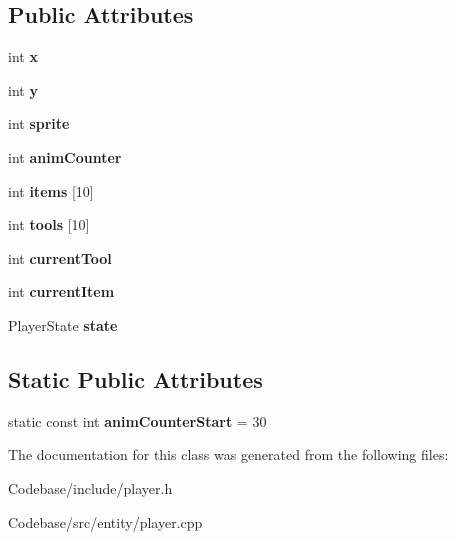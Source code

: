 \subsection*{Public Attributes}
\begin{DoxyCompactItemize}
\item 
\hypertarget{class_player_ad285b3cb25e4a46ca944b9a416c1b13f}{int {\bfseries x}}\label{class_player_ad285b3cb25e4a46ca944b9a416c1b13f}

\item 
\hypertarget{class_player_a6da29d6e3783c6028c92647bbde478f5}{int {\bfseries y}}\label{class_player_a6da29d6e3783c6028c92647bbde478f5}

\item 
\hypertarget{class_player_aac9bac60b3b27c77a1970f7e7999f5d5}{int {\bfseries sprite}}\label{class_player_aac9bac60b3b27c77a1970f7e7999f5d5}

\item 
\hypertarget{class_player_aa4536c3254fa3b774cd5b04483a3255b}{int {\bfseries anim\-Counter}}\label{class_player_aa4536c3254fa3b774cd5b04483a3255b}

\item 
\hypertarget{class_player_a6bcb0c797b73c3ea5e3d8ef797656c92}{int {\bfseries items} \mbox{[}10\mbox{]}}\label{class_player_a6bcb0c797b73c3ea5e3d8ef797656c92}

\item 
\hypertarget{class_player_aee04f54f61b45e5912b48fb9203cad38}{int {\bfseries tools} \mbox{[}10\mbox{]}}\label{class_player_aee04f54f61b45e5912b48fb9203cad38}

\item 
\hypertarget{class_player_aec48acba12d8b9245b4ba09146e0113c}{int {\bfseries current\-Tool}}\label{class_player_aec48acba12d8b9245b4ba09146e0113c}

\item 
\hypertarget{class_player_ab3f59417c9a2ee2d8a39a7a20f18dd51}{int {\bfseries current\-Item}}\label{class_player_ab3f59417c9a2ee2d8a39a7a20f18dd51}

\item 
\hypertarget{class_player_afb60fdad921bce05783ef2709e849c27}{Player\-State {\bfseries state}}\label{class_player_afb60fdad921bce05783ef2709e849c27}

\end{DoxyCompactItemize}
\subsection*{Static Public Attributes}
\begin{DoxyCompactItemize}
\item 
\hypertarget{class_player_af6cb41cc776191c988c8fa835fd12bc4}{static const int {\bfseries anim\-Counter\-Start} = 30}\label{class_player_af6cb41cc776191c988c8fa835fd12bc4}

\end{DoxyCompactItemize}


The documentation for this class was generated from the following files\-:\begin{DoxyCompactItemize}
\item 
Codebase/include/player.\-h\item 
Codebase/src/entity/player.\-cpp\end{DoxyCompactItemize}
